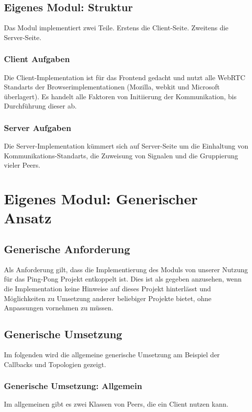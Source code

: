 \subsection{Eigenes Modul: Struktur}
Das Modul implementiert zwei Teile. Erstens die Client-Seite. Zweitens die 
Server-Seite.



\subsubsection{Client Aufgaben}
Die Client-Implementation ist für das Frontend gedacht und nutzt alle WebRTC 
Standarts der Browserimplementationen (Mozilla, webkit und Microsoft überlagert). 
Es handelt alle Faktoren von Initiierung der Kommunikation, bis Durchführung dieser ab.



\subsubsection{Server Aufgaben}
Die Server-Implementation kümmert sich auf Server-Seite um die Einhaltung von 
Kommunikations-Standarts, die Zuweisung von Signalen und die Gruppierung vieler 
Peers.



\section{Eigenes Modul: Generischer Ansatz}

\subsection{Generische Anforderung}
Als Anforderung gilt, dass die Implementierung des Moduls von unserer Nutzung für das Ping-Pong Projekt entkoppelt ist. 
Dies ist als gegeben anzusehen, wenn die Implementation keine Hinweise auf dieses Projekt hinterlässt und Möglichkeiten zu Umsetzung anderer beliebiger Projekte bietet, ohne Anpassungen vornehmen zu müssen.



\subsection{Generische Umsetzung}
Im folgenden wird die allgemeine generische Umsetzung am Beispiel der Callbacks und Topologien gezeigt.



\subsubsection{Generische Umsetzung: Allgemein}
Im allgemeinen gibt es zwei Klassen von Peers, die ein Client nutzen kann.

